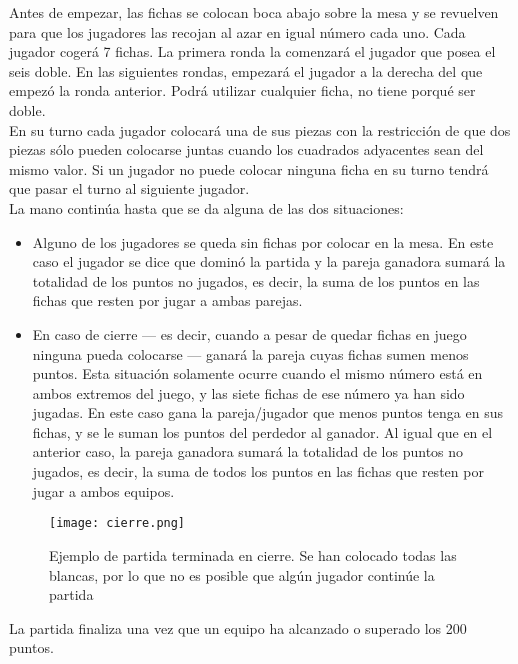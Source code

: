 Antes de empezar, las fichas se colocan boca abajo sobre la mesa y se revuelven para que los jugadores
las recojan al azar en igual número cada uno. Cada jugador cogerá 7 fichas. La primera ronda la comenzará
el jugador que posea el seis doble. En las siguientes rondas, empezará el jugador a la derecha del que
empezó la ronda anterior. Podrá utilizar cualquier ficha, no tiene porqué ser doble. \\

En su turno cada jugador colocará una de sus piezas con la restricción de que dos piezas sólo pueden
colocarse juntas cuando los cuadrados adyacentes sean del mismo valor. Si un jugador no puede colocar
ninguna ficha en su turno tendrá que pasar el turno al siguiente jugador. \\

La mano continúa hasta que se da alguna de las dos situaciones:
\begin{itemize}
    \item Alguno de los jugadores se queda sin fichas por colocar en la mesa. En este caso el jugador se
        dice que dominó la partida y la pareja ganadora sumará la totalidad de los puntos no jugados,
        es decir, la suma de los puntos en las fichas que resten por jugar a ambas parejas.
    \item En caso de cierre --- es decir, cuando a pesar de quedar fichas en juego ninguna pueda colocarse ---
        ganará la pareja cuyas fichas sumen menos puntos. Esta situación solamente ocurre cuando el mismo número
        está en ambos extremos del juego, y las siete fichas de ese número ya han sido jugadas. En este caso
        gana la pareja/jugador que menos puntos tenga en sus fichas, y se le suman los puntos del perdedor al ganador.
        Al igual que en el anterior caso, la pareja ganadora sumará la totalidad de los puntos no jugados,
        es decir, la suma de todos los puntos en las fichas que resten por jugar a ambos equipos.
\end{itemize}

\begin{figure}[h]
  \label{cierre}
  \begin{center}
    \texttt{[image: cierre.png]}
  \end{center}
  \caption{Ejemplo de partida terminada en cierre. Se han colocado todas las blancas, por lo que no es posible
            que algún jugador continúe la partida}
\end{figure}


La partida finaliza una vez que un equipo ha alcanzado o superado los 200 puntos. \\

